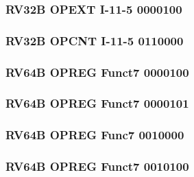 

\subsubsection[{\small RV32B OPEXT I-11-5 0000100}]{RV32B OPEXT I-11-5 0000100} \label{sec:format-RV32B-OPEXT-0x04}



\subsubsection[{\small RV32B OPCNT I-11-5 0110000}]{RV32B OPCNT I-11-5 0110000} \label{sec:format-RV32B-OPCNT-0x30}



\subsubsection[{\small RV64B OPREG Funct7 0000100}]{RV64B OPREG Funct7 0000100} \label{sec:format-RV64B-OPREG-0x04}



\subsubsection[{\small RV64B OPREG Funct7 0000101}]{RV64B OPREG Funct7 0000101} \label{sec:format-RV64B-OPREG-0x05}



\subsubsection[{\small RV64B OPREG Func7 0010000}]{RV64B OPREG Func7 0010000} \label{sec:format-RV64B-OPREG-0x10}



\subsubsection[{\small RV64B OPREG Funct7 0010100}]{RV64B OPREG Funct7 0010100} \label{sec:format-RV64B-OPREG-0x14}



